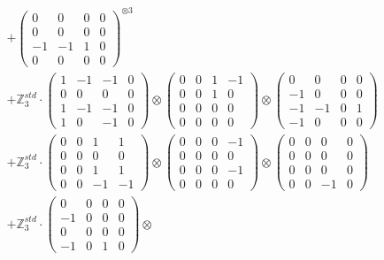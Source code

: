 \documentclass{article}
\begin{document}
{\begin{align}
        &+ \label{Rs16-Rc11-Solution-30-c16} \begin{pmatrix} 0 & 0 & 0 & 0 \\ 0 & 0 & 0 & 0 \\ -1 & -1 & 1 & 0 \\ 0 & 0 & 0 & 0 \end{pmatrix}^{\otimes 3} \\
        &+ \label{Rs16-Rc11-Solution-30-c17} \mathbb{Z}_3^{std} \cdot 
            \begin{pmatrix} 1 & -1 & -1 & 0 \\ 0 & 0 & 0 & 0 \\ 1 & -1 & -1 & 0 \\ 1 & 0 & -1 & 0 \end{pmatrix} \otimes 
            \begin{pmatrix} 0 & 0 & 1 & -1 \\ 0 & 0 & 1 & 0 \\ 0 & 0 & 0 & 0 \\ 0 & 0 & 0 & 0 \end{pmatrix} \otimes 
            \begin{pmatrix} 0 & 0 & 0 & 0 \\ -1 & 0 & 0 & 0 \\ -1 & -1 & 0 & 1 \\ -1 & 0 & 0 & 0 \end{pmatrix} \\ 
        &+ \label{Rs16-Rc11-Solution-30-c18} \mathbb{Z}_3^{std} \cdot 
            \begin{pmatrix} 0 & 0 & 1 & 1 \\ 0 & 0 & 0 & 0 \\ 0 & 0 & 1 & 1 \\ 0 & 0 & -1 & -1 \end{pmatrix} \otimes 
            \begin{pmatrix} 0 & 0 & 0 & -1 \\ 0 & 0 & 0 & 0 \\ 0 & 0 & 0 & -1 \\ 0 & 0 & 0 & 0 \end{pmatrix} \otimes 
            \begin{pmatrix} 0 & 0 & 0 & 0 \\ 0 & 0 & 0 & 0 \\ 0 & 0 & 0 & 0 \\ 0 & 0 & -1 & 0 \end{pmatrix} \\ 
        &+ \label{Rs16-Rc11-Solution-30-c19} \mathbb{Z}_3^{std} \cdot 
            \begin{pmatrix} 0 & 0 & 0 & 0 \\ -1 & 0 & 0 & 0 \\ 0 & 0 & 0 & 0 \\ -1 & 0 & 1 & 0 \end{pmatrix} \otimes 

\end{align}}
\end{document}
